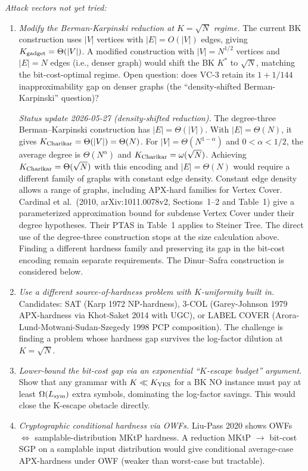\documentclass[
]{article}
\begin{document}
\emph{Attack vectors not yet tried:}
\begin{enumerate}
\item \emph{Modify the Berman-Karpinski reduction at $K = \sqrt{N}$
regime.} The current BK construction uses $|V|$ vertices with $|E|
= O(|V|)$ edges, giving $K_{\rm gadget} = \Theta(|V|)$. A modified
construction with $|V| = N^{1/2}$ vertices and $|E| = N$ edges (i.e.,
denser graph) would shift the BK $K^*$ to $\sqrt{N}$, matching the
bit-cost-optimal regime. Open question: does VC-3 retain its
$1 + 1/144$ inapproximability gap on denser graphs (the
``density-shifted Berman-Karpinski'' question)?

\emph{Status update 2026-05-27 (density-shifted reduction).}
The degree-three Berman--Karpinski construction has $|E|=\Theta(|V|)$.
With $|E|=\Theta(N)$, it gives $K_{\rm Charikar}=\Theta(|V|)=\Theta(N)$.
For $|V|=\Theta(N^{1-\alpha})$ and $0<\alpha<1/2$, the average degree is
$\Theta(N^\alpha)$ and $K_{\rm Charikar}=\omega(\sqrt N)$. Achieving
$K_{\rm Charikar}=\Theta(\sqrt N)$ with this encoding and $|E|=\Theta(N)$
would require a different family of graphs with constant edge density.
Constant edge density allows a range of graphs, including APX-hard
families for Vertex Cover. Cardinal et al.\ (2010, arXiv:1011.0078v2,
Sections~1--2 and Table~1) give a parameterized approximation bound for
subdense Vertex Cover under their degree hypotheses. Their PTAS in
Table~1 applies to Steiner Tree. The direct use of the degree-three
construction stops at the size calculation above. Finding a different
hardness family and preserving its gap in the bit-cost encoding remain
separate requirements. The Dinur--Safra construction is considered below.
\item \emph{Use a different source-of-hardness problem with
$K$-uniformity built in.} Candidates: SAT (Karp 1972 NP-hardness),
3-COL (Garey-Johnson 1979 APX-hardness via Khot-Saket 2014 with UGC),
or LABEL COVER (Arora-Lund-Motwani-Sudan-Szegedy 1998 PCP composition).
The challenge is finding a problem whose hardness gap survives the
log-factor dilution at $K = \sqrt{N}$.
\item \emph{Lower-bound the bit-cost gap via an exponential
``$K$-escape budget'' argument.} Show that any grammar with $K \ll
K_{\rm YES}$ for a BK NO instance must pay at least $\Omega(L_{\rm sym})$
extra symbols, dominating the log-factor savings. This would close
the K-escape obstacle directly.
\item \emph{Cryptographic conditional hardness via OWFs.} Liu-Pass 2020
shows OWFs $\Leftrightarrow$ samplable-distribution MKtP hardness.
A reduction MKtP $\to$ bit-cost SGP on a samplable input distribution
would give conditional average-case APX-hardness under OWF (weaker
than worst-case but tractable).
\end{enumerate}
\end{document}

